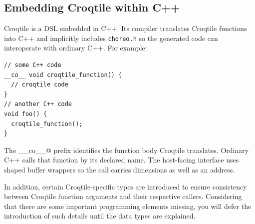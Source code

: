 \subsection*{Embedding Croqtile within C++}

Croqtile is a DSL embedded in C++. Its compiler translates Croqtile functions into C++ and implicitly includes \texttt{choreo.h} so the generated code can interoperate with ordinary C++. For example:

\begin{lstlisting}[language=croqtile,caption={Embedding Croqtile within C++}]
// some C++ code
__co__ void croqtile_function() {
  // croqtile code
}
// another C++ code
void foo() {
  croqtile_function();
}
\end{lstlisting}

The \co@__co__@ prefix identifies the function body Croqtile translates. Ordinary C++ calls that function by its declared name. The host-facing interface uses shaped buffer wrappers so the call carries dimensions as well as an address.

In addition, certain Croqtile-specific types are introduced to ensure consistency between Croqtile function arguments and their respective callers. Considering that there are some important programming elements missing, you will defer the introduction of such details until the data types are explained.
